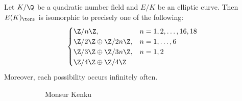 \begin{frame}[plain]
\end{frame}


\begin{frame}[plain]
\begin{thm}
 Let $K/\Q$ be a quadratic number field and $E/K$ be an elliptic curve. Then $E(K)_\tors$ is isomorphic to precisely one of the following:
 	\[
	\begin{cases}
	\Z/n\Z, & n=1,2,\ldots,16,18 \\
	\Z/2\Z \oplus \Z/2n\Z, & n=1,\ldots,6 \\
	\Z/3\Z \oplus \Z/3n\Z, & n=1,2 \\
	\Z/4\Z \oplus \Z/4\Z
	\end{cases}
	\]
Moreover, each possibility occurs infinitely often. 
\end{thm}
	\begin{figure}[h]
	\centering
	\begin{subfigure}{0.3\textwidth}
	\captionsetup{labelformat=empty}
	\centering
	\caption{Monsur Kenku}
	\end{subfigure} \quad
	\begin{subfigure}{0.3\textwidth}
	\captionsetup{labelformat=empty}
	\centering

\end{subfigure}
\end{figure}
\end{frame}
